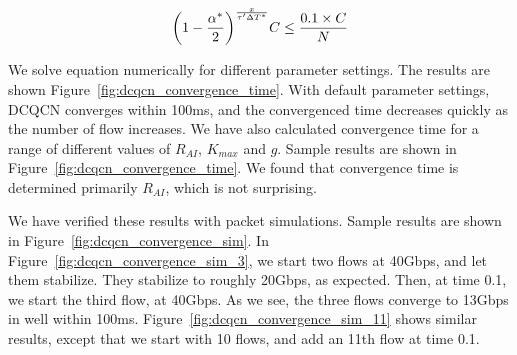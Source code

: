 \begin{equation} 
\small 
{ \left( {1 - \frac{{{\alpha ^*}}}{2}} \right)^{\frac{x}{{\tau '\Delta{T^*}}}}}C \le \frac{0.1 \times C}{N} 
\end{equation}

We solve equation numerically for different parameter settings. The results are
shown Figure~\ref{fig:dcqcn_convergence_time}. With default parameter settings,
DCQCN converges within 100ms, and the convergenced time decreases quickly as the
number of flow increases.  We have also calculated convergence time for a range
of different values of $R_{AI}$, $K_{max}$ and $g$. Sample results are shown in
Figure~\ref{fig:dcqcn_convergence_time}. We found that convergence time is
determined primarily $R_{AI}$, which is not surprising.

We have verified these results with packet simulations. Sample results are shown
in Figure~\ref{fig:dcqcn_convergence_sim}. In
Figure~\ref{fig:dcqcn_convergence_sim_3}, we start two flows at 40Gbps, and let
them stabilize. They stabilize to roughly 20Gbps, as expected. Then, at time
0.1, we start the third flow, at 40Gbps. As we see, the three flows converge to
13Gbps in well within 100ms. Figure~\ref{fig:dcqcn_convergence_sim_11} shows
similar results, except that we start with 10 flows, and add an 11th flow at
time 0.1.








